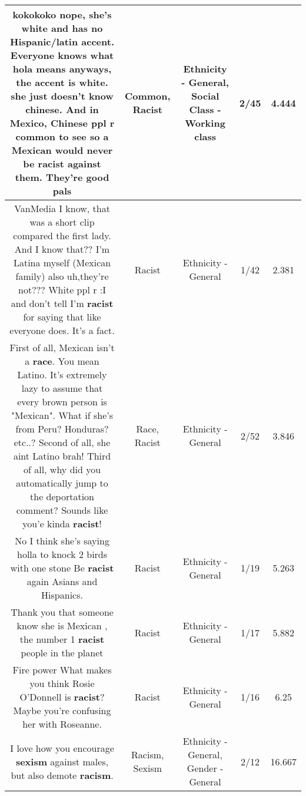 \documentclass[11pt]{article}
\newlength\mylength
\begin{document}
\begin{center}
\begin{longtable}{|C{.65\mylength}|C{.30\mylength}|C{.12\mylength}|C{.12\mylength}|C{.12\mylength}|}
  \small kokokoko nope, she's white and has no Hispanic/latin accent. Everyone knows what hola means anyways, the accent is white. she just doesn't know chinese. And in Mexico, Chinese ppl r \textbf{common} to see so a Mexican would never be \textbf{racist} against them. They're good pals\normalsize   & Common, Racist & Ethnicity - General, Social Class - Working class & 2/45 & 4.444 \\  \hline
  \small VanMedia I know, that was a short clip compared the first lady. And I know that?? I'm Latina myself (Mexican family) also uh,they're  not??? White ppl r :I and don't tell I'm \textbf{racist} for saying that like everyone does. It's a fact.\normalsize   & Racist & Ethnicity - General & 1/42 & 2.381 \\  \hline
  \small First of all, Mexican isn't a \textbf{race}. You mean Latino. It's extremely lazy to assume that every brown person is "Mexican". What if she's from Peru? Honduras? etc..? Second of all, she aint Latino brah! Third of all, why did you automatically jump to the deportation comment? Sounds like you'e  kinda \textbf{racist}!\normalsize   & Race, Racist & Ethnicity - General & 2/52 & 3.846 \\  \hline
  \small No I think she's saying holla to knock 2 birds with one stone Be \textbf{racist} again Asians and Hispanics.\normalsize   & Racist & Ethnicity - General & 1/19 & 5.263 \\  \hline
  \small Thank you that someone know she is Mexican , the number 1 \textbf{racist} people in the planet\normalsize   & Racist & Ethnicity - General & 1/17 & 5.882 \\  \hline
  \small Fire power What makes you think Rosie O'Donnell is \textbf{racist}?Maybe you're confusing her with Roseanne.\normalsize   & Racist & Ethnicity - General & 1/16 & 6.25 \\  \hline
  \small I love how you encourage \textbf{sexism} against males, but also demote \textbf{racism}.\normalsize   & Racism, Sexism & Ethnicity - General, Gender - General & 2/12 & 16.667 \\  \hline

\end{longtable}
\end{center}
\end{document}
